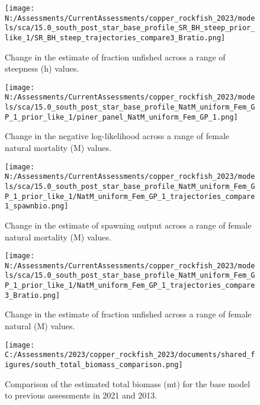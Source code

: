 \documentclass[11pt,
  english,
  letterpaper,
]{article}
\begin{document}
\pagebreak

\begin{figure}
\centering
\texttt{[image: N:/Assessments/CurrentAssessments/copper\_rockfish\_2023/models/sca/15.0\_south\_post\_star\_base\_profile\_SR\_BH\_steep\_prior\_like\_1/SR\_BH\_steep\_trajectories\_compare3\_Bratio.png]}
\caption{Change in the estimate of fraction unfished across a range of steepness (h) values.\label{fig:h-depl}}
\end{figure}

\pagebreak

\begin{figure}
\centering
\texttt{[image: N:/Assessments/CurrentAssessments/copper\_rockfish\_2023/models/sca/15.0\_south\_post\_star\_base\_profile\_NatM\_uniform\_Fem\_GP\_1\_prior\_like\_1/piner\_panel\_NatM\_uniform\_Fem\_GP\_1.png]}
\caption{Change in the negative log-likelihood across a range of female natural mortality (M) values.\label{fig:m-profile}}
\end{figure}

\pagebreak

\begin{figure}
\centering
\texttt{[image: N:/Assessments/CurrentAssessments/copper\_rockfish\_2023/models/sca/15.0\_south\_post\_star\_base\_profile\_NatM\_uniform\_Fem\_GP\_1\_prior\_like\_1/NatM\_uniform\_Fem\_GP\_1\_trajectories\_compare1\_spawnbio.png]}
\caption{Change in the estimate of spawning output across a range of female natural mortality (M) values.\label{fig:m-ssb}}
\end{figure}

\pagebreak

\begin{figure}
\centering
\texttt{[image: N:/Assessments/CurrentAssessments/copper\_rockfish\_2023/models/sca/15.0\_south\_post\_star\_base\_profile\_NatM\_uniform\_Fem\_GP\_1\_prior\_like\_1/NatM\_uniform\_Fem\_GP\_1\_trajectories\_compare3\_Bratio.png]}
\caption{Change in the estimate of fraction unfished across a range of female natural (M) values.\label{fig:m-depl}}
\end{figure}

\begin{figure}
\centering
\texttt{[image: C:/Assessments/2023/copper\_rockfish\_2023/documents/shared\_figures/south\_total\_biomass\_comparison.png]}
\caption{Comparison of the estimated total biomass (mt) for the base model to previous assessments in 2021 and 2013.\label{fig:comp-assess-sb}}
\end{figure}
\end{document}
